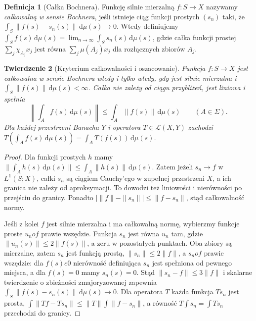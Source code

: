 \documentclass[11pt,a4paper]{article}
\numberwithin{equation}{section}
\theoremstyle{plain}
\newtheorem{twierdzenie}{Twierdzenie}[section]
\theoremstyle{definition}
\newtheorem{definicja}[twierdzenie]{Definicja}
\theoremstyle{remark}
\begin{document}
\begin{definicja}[Całka Bochnera]
\label{def:bochner15b}
Funkcję silnie mierzalną $f:S\to X$ nazywamy
\emph{całkowalną w sensie Bochnera}, jeśli istnieje ciąg
funkcji prostych $(s_n)$ taki, że
$\int_S\|f(s)-s_n(s)\|\,\mathrm d\mu(s)\to0$.
Wtedy definiujemy
$\int_S f(s)\,\mathrm d\mu(s)
=\lim_{n\to\infty}\int_S s_n(s)\,\mathrm d\mu(s)$,
gdzie całka funkcji prostej $\sum_j\chi_{A_j}x_j$ jest
równa $\sum_j\mu(A_j)x_j$ dla rozłącznych zbiorów $A_j$.
\end{definicja}

\begin{twierdzenie}[Kryterium całkowalności i oszacowanie]
\label{thm:bochner-criterion15b}
Funkcja $f:S\to X$ jest całkowalna w sensie Bochnera wtedy
i tylko wtedy, gdy jest silnie mierzalna i
$\int_S\|f(s)\|\,\mathrm d\mu(s)<\infty$.
Całka nie zależy od ciągu przybliżeń, jest liniowa i spełnia
\[
 \left\|\int_A f(s)\,\mathrm d\mu(s)\right\|
 \le\int_A\|f(s)\|\,\mathrm d\mu(s)\qquad(A\in\Sigma).
\]
Dla każdej przestrzeni Banacha $Y$ i operatora
$T\in\mathcal L(X,Y)$ zachodzi
$T(\int_A f(s)\,\mathrm d\mu(s))=\int_A T(f(s))\,\mathrm d\mu(s)$.
\end{twierdzenie}
\begin{proof}
Dla funkcji prostych $h$ mamy
$\|\int_A h(s)\,\mathrm d\mu(s)\|\le\int_A\|h(s)\|\,\mathrm d\mu(s)$.
Zatem jeżeli $s_n\to f$ w $L^1(S;X)$, całki $s_n$ są
ciągiem Cauchy'ego w zupełnej przestrzeni $X$, a ich granica
nie zależy od aproksymacji. To dowodzi też liniowości i
nierówności po przejściu do granicy. Ponadto
$|\|f\|-\|s_n\||\le\|f-s_n\|$, stąd całkowalność normy.

Jeśli z kolei $f$ jest silnie mierzalna i ma całkowalną normę,
wybierzmy funkcje proste $u_n	o f$ prawie wszędzie.
Funkcja $s_n$ jest równa $u_n$ tam, gdzie
$\|u_n(s)\|\le2\|f(s)\|$, a zeru w pozostałych punktach.
Oba zbiory są mierzalne, zatem $s_n$ jest funkcją prostą,
$\|s_n\|\le2\|f\|$, a $s_n	o f$ prawie wszędzie:
dla $f(s)
e0$ nierówność definiująca $s_n$ jest
spełniona od pewnego miejsca, a dla $f(s)=0$ mamy
$s_n(s)=0$. Stąd $\|s_n-f\|\le3\|f\|$ i skalarne
twierdzenie o zbieżności zmajoryzowanej zapewnia
$\int_S\|f(s)-s_n(s)\|\,\mathrm d\mu(s)\to0$.
Dla operatora $T$ każda funkcja $Ts_n$ jest prosta,
$\int\|Tf-Ts_n\|\le\|T\|\int\|f-s_n\|$, a równość
$T\int s_n=\int Ts_n$ przechodzi do granicy.
\end{proof}
\end{document}
